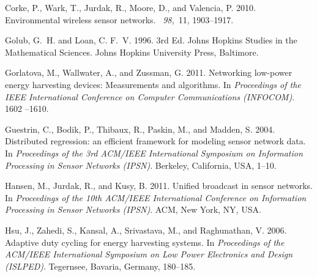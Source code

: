 \documentclass[prodmode,acmtosn]{acmsmall}
\begin{document}
\begin{thebibliography}{}
{\sc Corke, P.}, {\sc Wark, T.}, {\sc Jurdak, R.}, {\sc Moore, D.}, {\sc and}
  {\sc Valencia, P.} 2010.
\newblock Environmental wireless sensor networks.
~{\em 98,\/}~11, 1903--1917.

{\sc Golub, G.~H.} {\sc and} {\sc Loan, C. F.~V.} 1996.
 3rd Ed.
\newblock Johns Hopkins Studies in the Mathematical Sciences. Johns Hopkins
  University Press, Baltimore.

{\sc Gorlatova, M.}, {\sc Wallwater, A.}, {\sc and} {\sc Zussman, G.} 2011.
\newblock Networking low-power energy harvesting devices: Measurements and
  algorithms.
\newblock In {\em Proceedings of the IEEE International Conference on Computer
  Communications (INFOCOM)}. 1602 --1610.

{\sc Guestrin, C.}, {\sc Bodik, P.}, {\sc Thibaux, R.}, {\sc Paskin, M.}, {\sc
  and} {\sc Madden, S.} 2004.
\newblock Distributed regression: an efficient framework for modeling sensor
  network data.
\newblock In {\em Proceedings of the 3rd ACM/IEEE International Symposium on
  Information Processing in Sensor Networks (IPSN)}. Berkeley, California,
  {USA}, 1--10.

{\sc Hansen, M.}, {\sc Jurdak, R.}, {\sc and} {\sc Kusy, B.} 2011.
\newblock Unified broadcast in sensor networks.
\newblock In {\em Proceedings of the 10th ACM/IEEE International Conference on
  Information Processing in Sensor Networks (IPSN)}. ACM, New York, NY, USA.

{\sc Hsu, J.}, {\sc Zahedi, S.}, {\sc Kansal, A.}, {\sc Srivastava, M.}, {\sc
  and} {\sc Raghunathan, V.} 2006.
\newblock Adaptive duty cycling for energy harvesting systems.
\newblock In {\em Proceedings of the ACM/IEEE International Symposium on Low
  Power Electronics and Design (ISLPED)}. Tegernsee, Bavaria, Germany,
  180--185.


\end{thebibliography}
\end{document}
